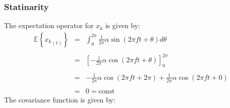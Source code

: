 \documentclass[11pt, a4paper]{article}
\begin{document}
\subsubsection{Statinarity}
The expectation operator for $x_k$ is given by:
\begin{equation}
    \begin{array}{rcl}
        \displaystyle \mathbb{E}{\left\{{x_k}_{\left(t\right)}\right\}} & = & \displaystyle \int_{0}^{2\pi}{\frac{1}{2\pi}\alpha\sin{\left(2\pi ft+\theta\right)}d\theta} \\\\
        & = & \displaystyle \left[-\frac{1}{2\pi}\alpha\cos{\left(2\pi ft+\theta\right)}\right]_0^{2\pi} \\\\
        & = & \displaystyle -\frac{1}{2\pi}\alpha\cos{\left(2\pi ft+2\pi\right)}+\frac{1}{2\pi}\alpha\cos{\left(2\pi ft+0\right)} \\\\
        & = & 0=\text{const}
    \end{array}
\end{equation}
The covariance function is given by:
\end{document}
